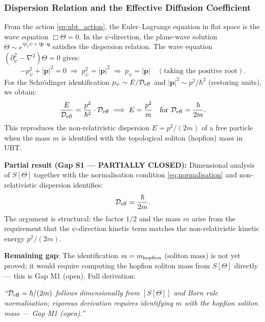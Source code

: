 \documentclass[12pt]{article}
\theoremstyle{definition}
\theoremstyle{remark}
\begin{document}
\subsubsection{Dispersion Relation and the Effective Diffusion Coefficient}

From the action \eqref{eq:ubt_action}, the Euler--Lagrange equation in flat space is
the wave equation $\Box\Theta = 0$.  In the $\psi$-direction, the plane-wave solution
$\Theta \sim e^{i p_\psi \psi + i \mathbf{p} \cdot \mathbf{q}}$ satisfies the dispersion relation.
The wave equation $(\partial_\psi^2 - \nabla^2)\Theta = 0$ gives:
\begin{equation}
  -p_\psi^2 + |\mathbf{p}|^2 = 0
  \;\Longrightarrow\;
  p_\psi^2 = |\mathbf{p}|^2
  \;\Longrightarrow\;
  p_\psi = |\mathbf{p}| \quad (\text{taking the positive root}).
  \label{eq:dispersion_raw}
\end{equation}
For the Schrödinger identification $p_\psi \sim E/\mathcal{D}_{\rm eff}$ and
$|\mathbf{p}|^2 \sim p^2/\hbar^2$ (restoring units), we obtain:
\begin{equation}
  \frac{E}{\mathcal{D}_{\rm eff}} = \frac{p^2}{\hbar^2}\cdot\mathcal{D}_{\rm eff}
  \;\Longrightarrow\;
  E = \frac{p^2}{m}
  \quad \text{for } \mathcal{D}_{\rm eff} = \frac{\hbar}{2m}.
  \label{eq:d_eff_from_dispersion}
\end{equation}
This reproduces the non-relativistic dispersion $E = p^2/(2m)$ of a free particle
when the mass $m$ is identified with the topological soliton (hopfion) mass in UBT.

\begin{resultbox}
\textbf{Partial result (Gap S1 — PARTIALLY CLOSED):}
Dimensional analysis of $S[\Theta]$ together with the normalisation condition
\eqref{eq:normalisation} and non-relativistic dispersion identifies:
\[
  \mathcal{D}_{\rm eff} = \frac{\hbar}{2m}.
\]
The argument is structural: the factor $1/2$ and the mass $m$ arise from the requirement
that the $\psi$-direction kinetic term matches the non-relativistic kinetic energy
$p^2/(2m)$.

\smallskip
\textbf{Remaining gap}: The identification $m = m_{\rm hopfion}$ (soliton mass)
is not yet proved; it would require computing the hopfion soliton mass from $S[\Theta]$
directly --- this is Gap M1 (open).  Full derivation:
\begin{center}
\emph{``$\mathcal{D}_{\rm eff} = \hbar/(2m)$ follows dimensionally from $[S[\Theta]]$ and
Born rule normalisation; rigorous derivation requires identifying $m$ with the hopfion
soliton mass --- Gap M1 (open).''}
\end{center}
\end{resultbox}
\end{document}

